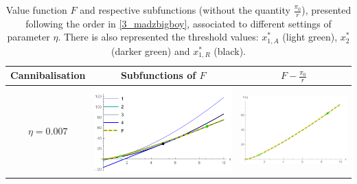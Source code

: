 \begin{table}[!htb]
	\caption{Value function $F$ and respective subfunctions (without the quantity $\frac{\pi_0}{r}$), presented following the order in  \eqref{3_madzbigboy}, associated to different settings of parameter $\eta$. There is also represented the threshold values: $x^*_{1,A}$ (light green),  $x^*_2$ (darker green) and $x^*_{1,R}$ (black).}
	\begin{tabular}{c|c|c}
		\hline
		Cannibalisation & Subfunctions of $F$ & $F-\frac{\pi_0}{r}$ \\ \hline
		$\eta=0.007$ & \begin{minipage}{.4\textwidth}
			\includegraphics[width=\linewidth]{Prob3/eta007_1.pdf}
		\end{minipage}
		& \begin{minipage}{.4\textwidth}
			\includegraphics[width=\linewidth]{Prob3/eta007dash_1.pdf}
		\end{minipage}
		\\ \hline

\end{tabular}
\end{table}
